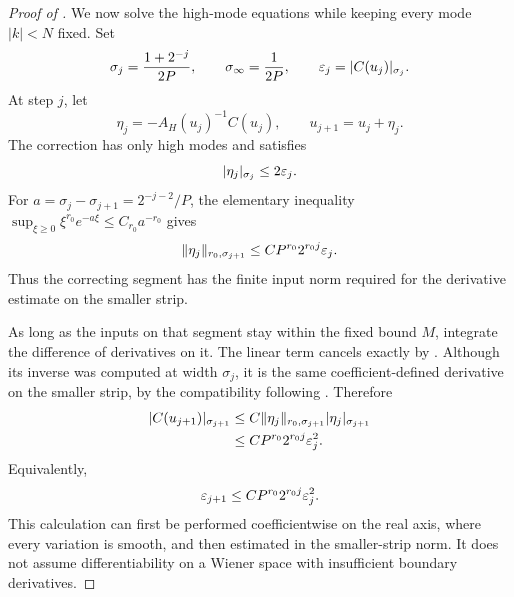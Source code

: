 \begin{proof}[Proof of ]
We now solve the high-mode equations while keeping every mode
\(|k|<N\) fixed.  Set
\[
\sigma_j=\frac{1+2^{-j}}{2P},
\qquad
\sigma_\infty=\frac1{2P},
\qquad
\varepsilon_j=|C(u_j)|_{\sigma_j}.
\]
At step \(j\), let
\begin{equation}\label{ana:newton-correction}
\eta_j=-A_H(u_j)^{-1}C(u_j),\qquad u_{j+1}=u_j+\eta_j.
\end{equation}
The correction has only high modes and satisfies
\[
|\eta_j|_{\sigma_j}\le2\varepsilon_j.
\]
For \(a=\sigma_j-\sigma_{j+1}=2^{-j-2}/P\), the elementary inequality
\(\sup_{\xi\ge0}\xi^{r_0}e^{-a\xi}\le C_{r_0}a^{-r_0}\) gives
\begin{equation}\label{ana:correction-smoothing}
\|\eta_j\|_{r_0,\sigma_{j+1}}
\le C P^{r_0}2^{r_0j}\varepsilon_j.
\end{equation}
Thus the correcting segment has the finite input norm required for
the derivative estimate on the smaller strip.

As long as the inputs on that segment stay within the fixed bound
\(M\), integrate the difference of derivatives on it.
The linear term cancels exactly by
.  Although its inverse was computed at
width \(\sigma_j\), it is the same coefficient-defined derivative on
the smaller strip, by the compatibility following
.  Therefore
\[
\begin{split}
|C(u_{j+1})|_{\sigma_{j+1}}
&\le
C\|\eta_j\|_{r_0,\sigma_{j+1}}
 |\eta_j|_{\sigma_{j+1}}\\
&\le C P^{r_0}2^{r_0j}\varepsilon_j^2.
\end{split}
\]
Equivalently,
\begin{equation}\label{ana:newton-recurrence}
\varepsilon_{j+1}\le
C P^{r_0}2^{r_0j}\varepsilon_j^2.
\end{equation}
This calculation can first be performed coefficientwise on the real
axis, where every variation is smooth, and then estimated in the
smaller-strip norm.  It does not assume differentiability on a
Wiener space with insufficient boundary derivatives.


\end{proof}
